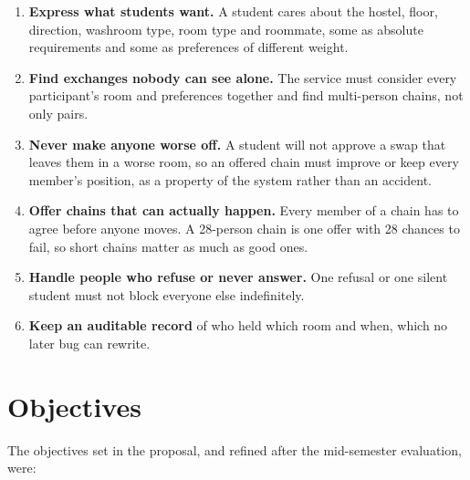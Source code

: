 \begin{enumerate}
  \item \textbf{Express what students want.} A student cares about the
  hostel, floor, direction, washroom type, room type and roommate, some
  as absolute requirements and some as preferences of different weight.
  \item \textbf{Find exchanges nobody can see alone.} The service must
  consider every participant's room and preferences together and find
  multi-person chains, not only pairs.
  \item \textbf{Never make anyone worse off.} A student will not approve
  a swap that leaves them in a worse room, so an offered chain must
  improve or keep every member's position, as a property of the system
  rather than an accident.
  \item \textbf{Offer chains that can actually happen.} Every member of a
  chain has to agree before anyone moves. A 28-person chain is one offer
  with 28 chances to fail, so short chains matter as much as good ones.
  \item \textbf{Handle people who refuse or never answer.} One refusal or
  one silent student must not block everyone else indefinitely.
  \item \textbf{Keep an auditable record} of who held which room and
  when, which no later bug can rewrite.
\end{enumerate}

\section{Objectives}

The objectives set in the proposal, and refined after the mid-semester
evaluation, were:

